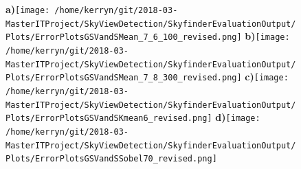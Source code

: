 \documentclass{article}
\begin{document}
\begin{figure}
\centering
\textbf{\scriptsize{a)}}\texttt{[image: /home/kerryn/git/2018-03-MasterITProject/SkyViewDetection/SkyfinderEvaluationOutput/Plots/ErrorPlotsGSVandSMean\_7\_6\_100\_revised.png]} 
\textbf{\scriptsize{b)}}\texttt{[image: /home/kerryn/git/2018-03-MasterITProject/SkyViewDetection/SkyfinderEvaluationOutput/Plots/ErrorPlotsGSVandSMean\_7\_8\_300\_revised.png]}
\textbf{\scriptsize{c)}}\texttt{[image: /home/kerryn/git/2018-03-MasterITProject/SkyViewDetection/SkyfinderEvaluationOutput/Plots/ErrorPlotsGSVandSKmean6\_revised.png]}
\textbf{\scriptsize{d)}}\texttt{[image: /home/kerryn/git/2018-03-MasterITProject/SkyViewDetection/SkyfinderEvaluationOutput/Plots/ErrorPlotsGSVandSSobel70\_revised.png]}
\end{figure}
\clearpage
\end{document}
